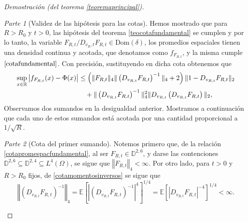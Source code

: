 \documentclass[letterpaper,twoside,12pt]{book}
\newcommand{\R}{\mathbb{R}}
\newcommand{\D}{\mathbb{D}}
\newcommand{\E}{\mathbb{E}}
\newcommand{\1}{\mathds{1}}
\newcommand{\abs}[1]{\left\lvert #1 \right\rvert}
\newcommand{\norm}[1]{\left\Vert #1 \right\Vert}
\theoremstyle{definition}
\theoremstyle{definition}
\theoremstyle{remark}
\newtheorem{proofpart}{Parte}
\theoremstyle{definition}
\theoremstyle{definition}
\theoremstyle{definition}
\theoremstyle{definition}
\theoremstyle{definition}
\begin{document}
\begin{proof}[Demostración (del teorema \ref{teoremaprincipal})]
\begin{proofpart}[Validez de las hipótesis para las cotas]
Hemos mostrado que para $R>R_0$ y $t>0$, las hipótesis del teorema \ref{teocotafundamental} se cumplen y por lo tanto, la variable $F_{R,t}/D_{v_R,t}F_{R,t}\in \text{Dom}(\delta)$, los promedios espaciales tienen una densidad continua y acotada, que denotamos como $f_{F_{R,t}}$, y la misma cumple  $\eqref{cotafundamental}$. Con precisión, sustituyendo en dicha cota obtenemos que 
\begin{align}\label{cotapromespacfundamental}
   \sup_{x\in \R} \abs{f_{F_{R,t}}(x)-\Phi(x)}&\leq \left(\|F_{R,t}\|_4\|\left(D_{v_{R,t}}F_{R,t}\right)^{-1}\|_4+2\right)\|1-D_{v_{R,t}}F_{R,t}\|_2\notag\\
   &\ \ \ +\|\left(D_{v_{R,t}}F_{R,t}\right)^{-1}\|^{2}_4\|D_{v_{R,t}} \left(D_{v_{R,t}}F_{R,t}\right)\|_2,
\end{align}
Observamos dos sumandos en la desigualdad anterior. Mostramos a continuación que cada uno de estos sumandos está acotada por una cantidad proporcional a $1/\sqrt{R}$.
\end{proofpart}
\begin{proofpart}[Cota del primer sumando]
Notemos primero que, de la relación \eqref{cotapromespacfundamental}, al ser $F_{R,t}\in \D^{2,6}$, y darse las contenciones $\D^{2,6}\subseteq \D^{2,4}\subseteq{L^{4}}(\Omega)$, se sigue que $\norm{F_{R,t}}_4<\infty$. Por otro lado, para $t>0$ y $R>R_0$ fijos, de \eqref{cotamomentosinversos} se sigue que 
\begin{equation}\label{cotapromespacmomentosinversos}
   \norm{(D_{v_{R,t}}F_{R,t})^{-1}}_4=\E\left[\abs{\left(D_{v_{R,t}}F_{R,t}\right)^{-1}}^{4}\right]^{1/4}=\E\left[\abs{D_{v_{R,t}}F_{R,t}}^{-4}\right]^{1/4}<\infty.
\end{equation}


\end{proofpart}
\end{proof}
\end{document}
